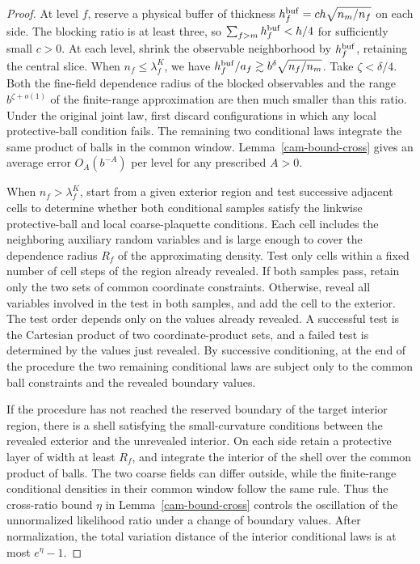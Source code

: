 \documentclass[11pt,a4paper]{article}
\numberwithin{equation}{section}
\begin{document}
\begin{proof}
At level \(f\), reserve a physical buffer of thickness \(h_f^{\rm buf}=ch\sqrt{n_m/n_f}\) on each side. The blocking ratio is at least three, so \(\sum_{f>m}h_f^{\rm buf}<h/4\) for sufficiently small \(c>0\). At each level, shrink the observable neighborhood by \(h_f^{\rm buf}\), retaining the central slice. When \(n_f\le\lambda_f^K\), we have \(h_f^{\rm buf}/a_f\gtrsim b^\delta\sqrt{n_f/n_m}\). Take \(\zeta<\delta/4\). Both the fine-field dependence radius of the blocked observables and the range \(b^{\zeta+o(1)}\) of the finite-range approximation are then much smaller than this ratio. Under the original joint law, first discard configurations in which any local protective-ball condition fails. The remaining two conditional laws integrate the same product of balls in the common window. Lemma~\ref{cam-bound-cross} gives an average error \(O_A(b^{-A})\) per level for any prescribed \(A>0\).

When \(n_f>\lambda_f^K\), start from a given exterior region and test successive adjacent cells to determine whether both conditional samples satisfy the linkwise protective-ball and local coarse-plaquette conditions. Each cell includes the neighboring auxiliary random variables and is large enough to cover the dependence radius \(R_f\) of the approximating density. Test only cells within a fixed number of cell steps of the region already revealed. If both samples pass, retain only the two sets of common coordinate constraints. Otherwise, reveal all variables involved in the test in both samples, and add the cell to the exterior. The test order depends only on the values already revealed. A successful test is the Cartesian product of two coordinate-product sets, and a failed test is determined by the values just revealed. By successive conditioning, at the end of the procedure the two remaining conditional laws are subject only to the common ball constraints and the revealed boundary values.

If the procedure has not reached the reserved boundary of the target interior region, there is a shell satisfying the small-curvature conditions between the revealed exterior and the unrevealed interior. On each side retain a protective layer of width at least \(R_f\), and integrate the interior of the shell over the common product of balls. The two coarse fields can differ outside, while the finite-range conditional densities in their common window follow the same rule. Thus the cross-ratio bound \(\eta\) in Lemma~\ref{cam-bound-cross} controls the oscillation of the unnormalized likelihood ratio under a change of boundary values. After normalization, the total variation distance of the interior conditional laws is at most \(e^\eta-1\).


\end{proof}
\end{document}

